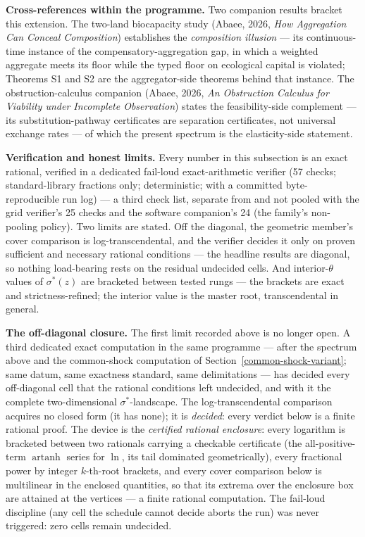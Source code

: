\documentclass[3p,11pt]{elsarticle}
\begin{document}
\textbf{Cross-references within the programme.} Two companion results
bracket this extension. The two-land biocapacity study (Abaee, 2026,
\emph{How Aggregation Can Conceal Composition}) establishes the
\emph{composition illusion} --- its continuous-time instance of the
compensatory-aggregation gap, in which a weighted aggregate meets its
floor while the typed floor on ecological capital is violated; Theorems S1
and S2 are the aggregator-side theorems behind that instance. The
obstruction-calculus companion (Abaee, 2026, \emph{An Obstruction
Calculus for Viability under Incomplete Observation}) states the
feasibility-side complement --- its substitution-pathway certificates are
separation certificates, not universal exchange rates --- of which the
present spectrum is the elasticity-side statement.

\textbf{Verification and honest limits.} Every number in this subsection
is an exact rational, verified in a dedicated fail-loud exact-arithmetic
verifier (57 checks; standard-library fractions only; deterministic; with
a committed byte-reproducible run log) --- a third check list, separate
from and not pooled with the grid verifier's 25 checks and the software
companion's 24 (the family's non-pooling policy). Two limits are stated.
Off the diagonal, the geometric member's cover comparison is
log-transcendental, and the verifier decides it only on proven sufficient
and necessary rational conditions --- the headline results are diagonal,
so nothing load-bearing rests on the residual undecided cells. And
interior-\(\theta\) values of \(\sigma^*(z)\) are bracketed between
tested rungs --- the brackets are exact and strictness-refined; the
interior value is the master root, transcendental in general.

\textbf{The off-diagonal closure.} The first limit recorded above
is no longer open. A third dedicated exact computation in the
same programme --- after the spectrum above and the common-shock
computation of Section~\ref{common-shock-variant}; same datum,
same exactness standard, same delimitations --- has decided every
off-diagonal cell that the rational conditions left undecided,
and with it the complete two-dimensional \(\sigma^*\)-landscape.
The log-transcendental comparison acquires no closed form (it has
none); it is \emph{decided}: every verdict below is a finite
rational proof. The device is the \emph{certified rational
enclosure}: every logarithm is bracketed between two rationals
carrying a checkable certificate (the all-positive-term
\(\operatorname{artanh}\) series for \(\ln\), its tail dominated
geometrically), every fractional power by integer \(k\)-th-root
brackets, and every cover comparison below is multilinear in the
enclosed quantities, so that its extrema over the enclosure box
are attained at the vertices --- a finite rational computation.
The fail-loud discipline (any cell the schedule cannot decide
aborts the run) was never triggered: zero cells remain undecided.
\end{document}
